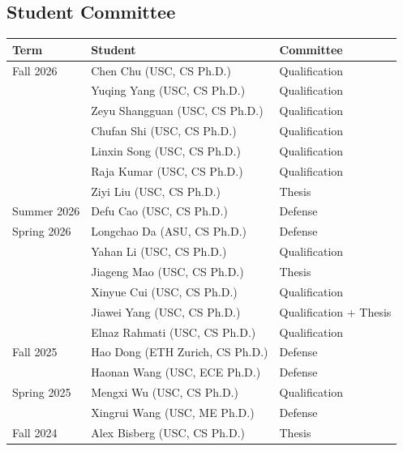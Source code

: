 \documentclass[margin,line,pifont,palatino,courier]{res}
\begin{document}
\begin{resume}
\section{\sc Student Committee}

\begin{tabularx}{\textwidth}{@{}>{\raggedright\arraybackslash}p{0.95in}X>{\raggedright\arraybackslash}p{1.7in}@{}}
\toprule
\textbf{Term} & \textbf{Student} & \textbf{Committee} \\
\midrule
Fall 2026 & Chen Chu (USC, CS Ph.D.) & Qualification \\
\multicolumn{1}{@{}l}{ } & Yuqing Yang (USC, CS Ph.D.) & Qualification \\
\multicolumn{1}{@{}l}{ } & Zeyu Shangguan (USC, CS Ph.D.) & Qualification \\
\multicolumn{1}{@{}l}{ } & Chufan Shi (USC, CS Ph.D.) & Qualification \\
\multicolumn{1}{@{}l}{ } & Linxin Song (USC, CS Ph.D.) & Qualification \\
\multicolumn{1}{@{}l}{ } & Raja Kumar (USC, CS Ph.D.) & Qualification \\
\multicolumn{1}{@{}l}{ } & Ziyi Liu (USC, CS Ph.D.) & Thesis \\
\addlinespace[0.15em]
Summer 2026 & Defu Cao (USC, CS Ph.D.) & Defense \\
\addlinespace[0.15em]
Spring 2026 & Longchao Da (ASU, CS Ph.D.) & Defense \\
\multicolumn{1}{@{}l}{ } & Yahan Li (USC, CS Ph.D.) & Qualification \\
\multicolumn{1}{@{}l}{ } & Jiageng Mao (USC, CS Ph.D.) & Thesis \\
\multicolumn{1}{@{}l}{ } & Xinyue Cui (USC, CS Ph.D.) & Qualification \\
\multicolumn{1}{@{}l}{ } & Jiawei Yang (USC, CS Ph.D.) & Qualification + Thesis \\
\multicolumn{1}{@{}l}{ } & Elnaz Rahmati (USC, CS Ph.D.) & Qualification \\
\addlinespace[0.15em]
Fall 2025 & Hao Dong (ETH Zurich, CS Ph.D.) & Defense \\
\multicolumn{1}{@{}l}{ } & Haonan Wang (USC, ECE Ph.D.) & Defense \\
\addlinespace[0.15em]
Spring 2025 & Mengxi Wu (USC, CS Ph.D.) & Qualification \\
\multicolumn{1}{@{}l}{ } & Xingrui Wang (USC, ME Ph.D.) & Defense \\
\addlinespace[0.15em]
Fall 2024 & Alex Bisberg (USC, CS Ph.D.) & Thesis \\

\end{tabularx}
\end{resume}
\end{document}
